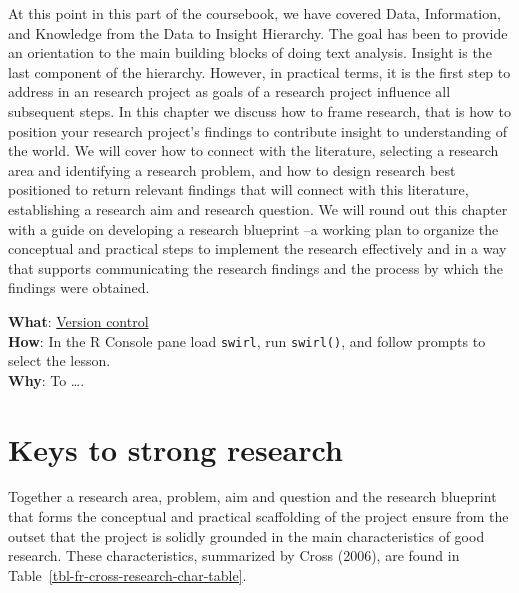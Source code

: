 \documentclass[
  letterpaper,
]{latex/krantz}
\begin{document}
At this point in this part of the coursebook, we have covered Data,
Information, and Knowledge from the Data to Insight Hierarchy. The goal
has been to provide an orientation to the main building blocks of doing
text analysis. Insight is the last component of the hierarchy. However,
in practical terms, it is the first step to address in an research
project as goals of a research project influence all subsequent steps.
In this chapter we discuss how to frame research, that is how to
position your research project's findings to contribute insight to
understanding of the world. We will cover how to connect with the
literature, selecting a research area and identifying a research
problem, and how to design research best positioned to return relevant
findings that will connect with this literature, establishing a research
aim and research question. We will round out this chapter with a guide
on developing a research blueprint --a working plan to organize the
conceptual and practical steps to implement the research effectively and
in a way that supports communicating the research findings and the
process by which the findings were obtained.

\begin{tcolorbox}[enhanced jigsaw, toprule=.15mm, bottomtitle=1mm, coltitle=black, title=\textcolor{quarto-callout-tip-color}{\faLightbulb}\hspace{0.5em}{Interactive programming}, left=2mm, colframe=quarto-callout-tip-color-frame, bottomrule=.15mm, colbacktitle=quarto-callout-tip-color!10!white, leftrule=.75mm, colback=white, titlerule=0mm, breakable, toptitle=1mm, opacityback=0, arc=.35mm, rightrule=.15mm, opacitybacktitle=0.6]

\textbf{What}: \href{https://github.com/lin380/swirl}{Version control}\\
\textbf{How}: In the R Console pane load \texttt{swirl}, run
\texttt{swirl()}, and follow prompts to select the lesson.\\
\textbf{Why}: To \ldots.

\end{tcolorbox}

\hypertarget{keys-to-strong-research}{%
\section{Keys to strong research}\label{keys-to-strong-research}}

Together a research area, problem, aim and question and the research
blueprint that forms the conceptual and practical scaffolding of the
project ensure from the outset that the project is solidly grounded in
the main characteristics of good research. These characteristics,
summarized by Cross (2006), are found in
Table~\ref{tbl-fr-cross-research-char-table}.
\end{document}
